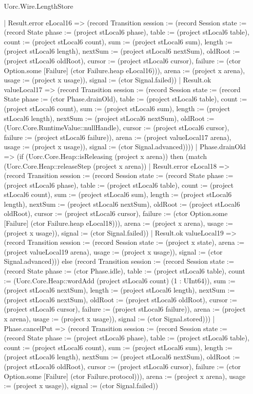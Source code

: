 \begin{lexlean}{Uorc.Wire.LengthStore}
\begin{semanticmodule}
{        | Result.error eLocal16 => (record Transition {session := (record Session {state := (record State {phase := (project stLocal6 phase), table := (project stLocal6 table), count := (project stLocal6 count), sum := (project stLocal6 sum), length := (project stLocal6 length), nextSum := (project stLocal6 nextSum), oldRoot := (project stLocal6 oldRoot), cursor := (project stLocal6 cursor), failure := (ctor Option.some [Failure] (ctor Failure.heap eLocal16))}), arena := (project x arena), usage := (project x usage)}), signal := (ctor Signal.failed)})
        | Result.ok valueLocal17 => (record Transition {session := (record Session {state := (record State {phase := (ctor Phase.drainOld), table := (project stLocal6 table), count := (project stLocal6 count), sum := (project stLocal6 sum), length := (project stLocal6 length), nextSum := (project stLocal6 nextSum), oldRoot := (Uorc.Core.RuntimeValue::nullHandle), cursor := (project stLocal6 cursor), failure := (project stLocal6 failure)}), arena := (project valueLocal17 arena), usage := (project x usage)}), signal := (ctor Signal.advanced)})))
      | Phase.drainOld => (if (Uorc.Core.Heap::isReleasing (project x arena)) then (match (Uorc.Core.Heap::releaseStep (project x arena))
        | Result.error eLocal18 => (record Transition {session := (record Session {state := (record State {phase := (project stLocal6 phase), table := (project stLocal6 table), count := (project stLocal6 count), sum := (project stLocal6 sum), length := (project stLocal6 length), nextSum := (project stLocal6 nextSum), oldRoot := (project stLocal6 oldRoot), cursor := (project stLocal6 cursor), failure := (ctor Option.some [Failure] (ctor Failure.heap eLocal18))}), arena := (project x arena), usage := (project x usage)}), signal := (ctor Signal.failed)})
        | Result.ok valueLocal19 => (record Transition {session := (record Session {state := (project x state), arena := (project valueLocal19 arena), usage := (project x usage)}), signal := (ctor Signal.advanced)})) else (record Transition {session := (record Session {state := (record State {phase := (ctor Phase.idle), table := (project stLocal6 table), count := (Uorc.Core.Heap::wordAdd (project stLocal6 count) (1 : UInt64)), sum := (project stLocal6 nextSum), length := (project stLocal6 length), nextSum := (project stLocal6 nextSum), oldRoot := (project stLocal6 oldRoot), cursor := (project stLocal6 cursor), failure := (project stLocal6 failure)}), arena := (project x arena), usage := (project x usage)}), signal := (ctor Signal.stored)}))
      | Phase.cancelPut => (record Transition {session := (record Session {state := (record State {phase := (project stLocal6 phase), table := (project stLocal6 table), count := (project stLocal6 count), sum := (project stLocal6 sum), length := (project stLocal6 length), nextSum := (project stLocal6 nextSum), oldRoot := (project stLocal6 oldRoot), cursor := (project stLocal6 cursor), failure := (ctor Option.some [Failure] (ctor Failure.protocol))}), arena := (project x arena), usage := (project x usage)}), signal := (ctor Signal.failed)})
}
\end{semanticmodule}
\end{lexlean}
